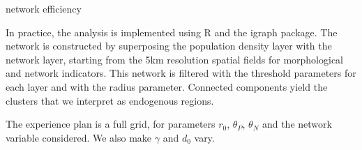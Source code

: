 \documentclass{jimis-en}
\begin{document}




\cite{banos2012towards} network efficiency



In practice, the analysis is implemented using R and the igraph package. The network is constructed by superposing the population density layer with the network layer, starting from the 5km resolution spatial fields for morphological and network indicators. This network is filtered with the threshold parameters for each layer and with the radius parameter. Connected components yield the clusters that we interpret as endogenous regions.


The experience plan is a full grid, for parameters $r_0$, $\theta_P$, $\theta_N$ and the network variable considered.
We also make $\gamma$ and $d_0$ vary.

\end{document}
